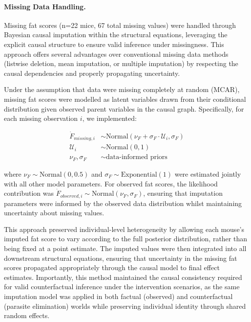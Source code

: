 \documentclass[a4paper, hidelinks, 11pt]{article}
\begin{document}
\begin{appendices}
	\paragraph{Missing Data Handling.}\label{supdata:MissingDataHandling} Missing fat scores (n=22 mice, 67 total missing values) were handled through Bayesian causal imputation within the structural equations, leveraging the explicit causal structure to ensure valid inference under missingness. This approach offers several advantages over conventional missing data methods (listwise deletion, mean imputation, or multiple imputation) by respecting the causal dependencies and properly propagating uncertainty.

	Under the assumption that data were missing completely at random (MCAR), missing fat scores were modelled as latent variables drawn from their conditional distribution given observed parent variables in the causal graph. Specifically, for each missing observation $i$, we implemented:

	\begin{align}
		\dot{F}_{missing,i} & \sim \text{Normal}(\nu_F + \sigma_F \cdot \mathcal{U}_i, \sigma_F) \\
		\mathcal{U}_i       & \sim \text{Normal}(0,1)                                            \\
		\nu_F, \sigma_F     & \sim \text{data-informed priors}
	\end{align}

	where $\nu_F \sim \text{Normal}(0, 0.5)$ and $\sigma_F \sim \text{Exponential}(1)$ were estimated jointly with all other model parameters. For observed fat scores, the likelihood contribution was $\dot{F}_{observed,i} \sim \text{Normal}(\nu_F, \sigma_F)$, ensuring that imputation parameters were informed by the observed data distribution whilst maintaining uncertainty about missing values.

	This approach preserved individual-level heterogeneity by allowing each mouse's imputed fat score to vary according to the full posterior distribution, rather than being fixed at a point estimate. The imputed values were then integrated into all downstream structural equations, ensuring that uncertainty in the missing fat scores propagated appropriately through the causal model to final effect estimates. Importantly, this method maintained the causal consistency required for valid counterfactual inference under the intervention scenarios, as the same imputation model was applied in both factual (observed) and counterfactual (parasite elimination) worlds while preserving individual identity through shared random effects.


\end{appendices}
\end{document}
